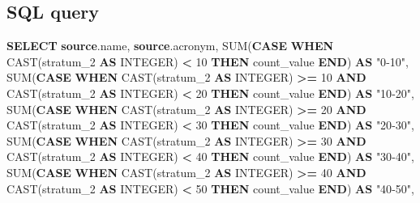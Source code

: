 \documentclass[
]{book}
\newenvironment{Shaded}{\begin{snugshade}}{\end{snugshade}}
\newcommand{\ControlFlowTok}[1]{\textcolor[rgb]{0.13,0.29,0.53}{\textbf{#1}}}
\newcommand{\DataTypeTok}[1]{\textcolor[rgb]{0.13,0.29,0.53}{#1}}
\newcommand{\DecValTok}[1]{\textcolor[rgb]{0.00,0.00,0.81}{#1}}
\newcommand{\FunctionTok}[1]{\textcolor[rgb]{0.00,0.00,0.00}{#1}}
\newcommand{\KeywordTok}[1]{\textcolor[rgb]{0.13,0.29,0.53}{\textbf{#1}}}
\newcommand{\NormalTok}[1]{#1}
\newcommand{\OperatorTok}[1]{\textcolor[rgb]{0.81,0.36,0.00}{\textbf{#1}}}
\newcommand{\OtherTok}[1]{\textcolor[rgb]{0.56,0.35,0.01}{#1}}
\begin{document}
\hypertarget{sql-query-8}{%
\subsection{SQL query}\label{sql-query-8}}

\begin{Shaded}
\begin{Highlighting}[]
\KeywordTok{SELECT} \KeywordTok{source}\NormalTok{.name,}
       \KeywordTok{source}\NormalTok{.acronym,}
       \FunctionTok{SUM}\NormalTok{(}\ControlFlowTok{CASE} \ControlFlowTok{WHEN} \FunctionTok{CAST}\NormalTok{(stratum\_2 }\KeywordTok{AS} \DataTypeTok{INTEGER}\NormalTok{) }\OperatorTok{\textless{}} \DecValTok{10} \ControlFlowTok{THEN}\NormalTok{ count\_value }\ControlFlowTok{END}\NormalTok{) }\KeywordTok{AS} \OtherTok{"0{-}10"}\NormalTok{,}
       \FunctionTok{SUM}\NormalTok{(}\ControlFlowTok{CASE} \ControlFlowTok{WHEN} \FunctionTok{CAST}\NormalTok{(stratum\_2 }\KeywordTok{AS} \DataTypeTok{INTEGER}\NormalTok{) }\OperatorTok{\textgreater{}=} \DecValTok{10} \KeywordTok{AND} \FunctionTok{CAST}\NormalTok{(stratum\_2 }\KeywordTok{AS} \DataTypeTok{INTEGER}\NormalTok{) }\OperatorTok{\textless{}} \DecValTok{20} \ControlFlowTok{THEN}\NormalTok{ count\_value }\ControlFlowTok{END}\NormalTok{) }\KeywordTok{AS} \OtherTok{"10{-}20"}\NormalTok{,}
       \FunctionTok{SUM}\NormalTok{(}\ControlFlowTok{CASE} \ControlFlowTok{WHEN} \FunctionTok{CAST}\NormalTok{(stratum\_2 }\KeywordTok{AS} \DataTypeTok{INTEGER}\NormalTok{) }\OperatorTok{\textgreater{}=} \DecValTok{20} \KeywordTok{AND} \FunctionTok{CAST}\NormalTok{(stratum\_2 }\KeywordTok{AS} \DataTypeTok{INTEGER}\NormalTok{) }\OperatorTok{\textless{}} \DecValTok{30} \ControlFlowTok{THEN}\NormalTok{ count\_value }\ControlFlowTok{END}\NormalTok{) }\KeywordTok{AS} \OtherTok{"20{-}30"}\NormalTok{,}
       \FunctionTok{SUM}\NormalTok{(}\ControlFlowTok{CASE} \ControlFlowTok{WHEN} \FunctionTok{CAST}\NormalTok{(stratum\_2 }\KeywordTok{AS} \DataTypeTok{INTEGER}\NormalTok{) }\OperatorTok{\textgreater{}=} \DecValTok{30} \KeywordTok{AND} \FunctionTok{CAST}\NormalTok{(stratum\_2 }\KeywordTok{AS} \DataTypeTok{INTEGER}\NormalTok{) }\OperatorTok{\textless{}} \DecValTok{40} \ControlFlowTok{THEN}\NormalTok{ count\_value }\ControlFlowTok{END}\NormalTok{) }\KeywordTok{AS} \OtherTok{"30{-}40"}\NormalTok{,}
       \FunctionTok{SUM}\NormalTok{(}\ControlFlowTok{CASE} \ControlFlowTok{WHEN} \FunctionTok{CAST}\NormalTok{(stratum\_2 }\KeywordTok{AS} \DataTypeTok{INTEGER}\NormalTok{) }\OperatorTok{\textgreater{}=} \DecValTok{40} \KeywordTok{AND} \FunctionTok{CAST}\NormalTok{(stratum\_2 }\KeywordTok{AS} \DataTypeTok{INTEGER}\NormalTok{) }\OperatorTok{\textless{}} \DecValTok{50} \ControlFlowTok{THEN}\NormalTok{ count\_value }\ControlFlowTok{END}\NormalTok{) }\KeywordTok{AS} \OtherTok{"40{-}50"}\NormalTok{,}

\end{Highlighting}
\end{Shaded}
\end{document}
